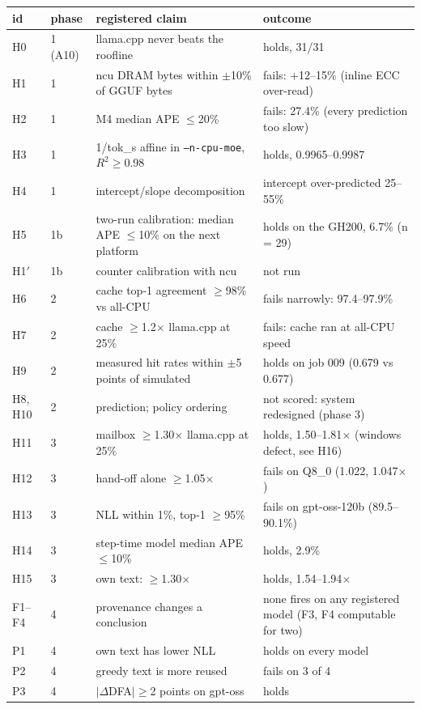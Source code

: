 {\small\begin{longtable}{llp{6.5cm}p{6.5cm}}\toprule id & phase & registered claim & outcome \\ \midrule\endhead\bottomrule\endfoot
H0 & 1 (A10) & llama.cpp never beats the roofline & holds, 31/31 \\
H1 & 1 & ncu DRAM bytes within $\pm$10\% of GGUF bytes & fails: +12--15\% (inline ECC over-read) \\
H2 & 1 & M4 median APE $\le$20\% & fails: 27.4\% (every prediction too slow) \\
H3 & 1 & 1/tok\_s affine in \texttt{--n-cpu-moe}, $R^2\ge$0.98 & holds, 0.9965--0.9987 \\
H4 & 1 & intercept/slope decomposition & intercept over-predicted 25--55\% \\
H5 & 1b & two-run calibration: median APE $\le$10\% on the next platform & holds on the GH200, 6.7\% (n = 29) \\
H1$'$ & 1b & counter calibration with ncu & not run \\
H6 & 2 & cache top-1 agreement $\ge$98\% vs all-CPU & fails narrowly: 97.4--97.9\% \\
H7 & 2 & cache $\ge$1.2$\times$ llama.cpp at 25\% & fails: cache ran at all-CPU speed \\
H9 & 2 & measured hit rates within $\pm$5 points of simulated & holds on job 009 (0.679 vs 0.677) \\
H8, H10 & 2 & prediction; policy ordering & not scored: system redesigned (phase 3) \\
H11 & 3 & mailbox $\ge$1.30$\times$ llama.cpp at 25\% & holds, 1.50--1.81$\times$ (windows defect, see H16) \\
H12 & 3 & hand-off alone $\ge$1.05$\times$ & fails on Q8\_0 (1.022, 1.047$\times$) \\
H13 & 3 & NLL within 1\%, top-1 $\ge$95\% & fails on gpt-oss-120b (89.5--90.1\%) \\
H14 & 3 & step-time model median APE $\le$10\% & holds, 2.9\% \\
H15 & 3 & own text: $\ge$1.30$\times$ & holds, 1.54--1.94$\times$ \\
F1--F4 & 4 & provenance changes a conclusion & none fires on any registered model (F3, F4 computable for two) \\
P1 & 4 & own text has lower NLL & holds on every model \\
P2 & 4 & greedy text is more reused & fails on 3 of 4 \\
P3 & 4 & $|\Delta$DFA$|\ge$2 points on gpt-oss & holds \\

\end{longtable}}

